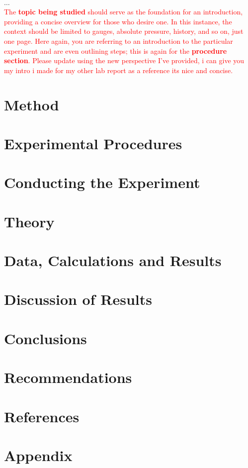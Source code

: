 \documentclass{article}
\begin{document}
\\[1em]	
	\Huge$\ldots$
	\large
\\[1em]
	\noindent
	\textcolor{red}{The \textbf{topic being studied} should serve as the foundation for an introduction, providing a concise overview for those who desire one.  In this instance, the context should be limited to gauges, absolute pressure, history, and so on, just one page.  Here again, you are referring to an introduction to the particular experiment and are even outlining steps; this is again for the \textbf{procedure section}. Please update using the new perspective I've provided, i can give you my intro i made for my other lab report as a reference its nice and concise.}\\[1em]

	
	\newpage\vspace*{-20pt}
	\section{Method}
	
	\newpage
	
	\section{Experimental Procedures}
	
	\newpage
	\section{Conducting the Experiment}
	
	\newpage
	\section{Theory}
	
	\newpage	
	\section{Data, Calculations and Results}
	
	\newpage
	\section{Discussion of Results}
	
	\newpage\vspace*{-30pt}
	\section{Conclusions}
	\newpage\vspace*{-30pt}
	
	\section{Recommendations}  		
	\newpage\vspace*{-30pt}
	
	
	\section{References}		
	\newpage\vspace*{-30pt}
	
	
	\section{Appendix}
	
\end{document}
